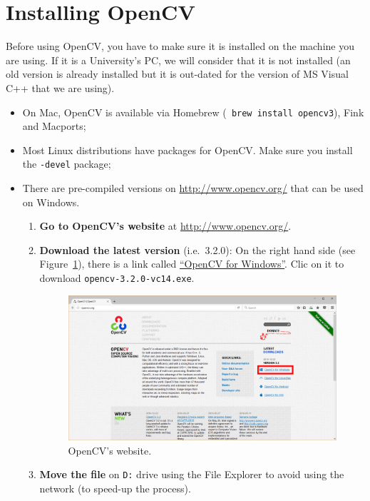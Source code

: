 \documentclass[english,a4paper,12pt,oneside]{article}
\begin{document}
\section{Installing OpenCV}
\label{sec:Installing OpenCV}
Before using OpenCV, you have to make sure it is installed on the machine you are using. 
If it is a University's PC, we will consider that it is not installed (an old version is already installed but it is out-dated for the version of MS Visual C++ that we are using). 
\begin{itemize}
	\item On Mac, OpenCV is available via Homebrew (\verb+ brew install opencv3+), Fink and Macports;
 \item Most Linux distributions have packages for OpenCV. Make sure you install the \verb+-devel+ package;
 \item There are pre-compiled versions on \url{http://www.opencv.org/} that can be used on Windows. 
	 \begin{enumerate}
	\item \textbf{Go to OpenCV's website} at \url{http://www.opencv.org/}. 
	\item \textbf{Download the latest version} (i.e.~3.2.0): On the right hand side (see Figure~\ref{fig:main_page}), there is a link called \href{https://sourceforge.net/projects/opencvlibrary/files/opencv-win/3.2.0/opencv-3.2.0-vc14.exe/download}{``OpenCV for Windows''}. 
		Clic on it to download \verb+opencv-3.2.0-vc14.exe+. 
		\begin{figure}[tbp]
			\centering
			\includegraphics[width=\textwidth]{opencv_mainpage.png}
			\caption{\label{fig:main_page}OpenCV's website.}
		\end{figure}
	\item \textbf{Move the file} on \verb+D:+ drive using the File Explorer to avoid using the network (to speed-up the process). 

\end{enumerate}
\end{itemize}
\end{document}
